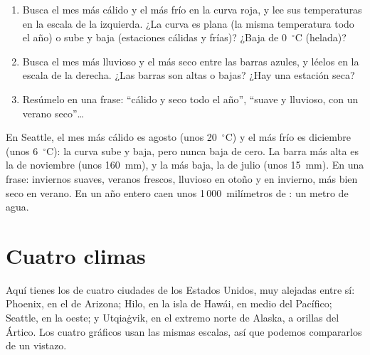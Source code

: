 \begin{method}\label{met:g5:weather-and-climate:reading}
\begin{enumerate}
  \item Busca el mes más cálido y el más frío en la curva roja, y lee sus
        temperaturas en la escala de la izquierda. ¿La curva es plana (la
        misma temperatura todo el año) o sube y baja (estaciones cálidas y
        frías)? ¿Baja de 0~$^\circ$C (helada)?
  \item Busca el mes más lluvioso y el más seco entre las barras azules, y
        léelos en la escala de la derecha. ¿Las barras son altas o bajas?
        ¿Hay una estación seca?
  \item Resúmelo en una frase: ``cálido y seco todo el año'', ``suave y
        lluvioso, con un verano seco''{\ldots}
\end{enumerate}
\end{method}

\begin{example}[Seattle]\label{ex:g5:weather-and-climate:seattle}
En Seattle, el mes más cálido es agosto (unos 20~$^\circ$C) y el más frío
es diciembre (unos 6~$^\circ$C): la curva sube y baja, pero nunca baja de
cero. La barra más alta es la de noviembre (unos 160~mm), y la más baja, la
de julio (unos 15~mm). En una frase: inviernos suaves, veranos frescos,
lluvioso en otoño y en invierno, más bien seco en verano. En un año entero
caen unos 1\,000~milímetros de : un metro de agua.
\end{example}

\section{Cuatro climas}

Aquí tienes los  de cuatro ciudades de los Estados Unidos, muy
alejadas entre sí: Phoenix, en el  de Arizona; Hilo, en la isla de
Hawái, en medio del  Pacífico; Seattle, en la  oeste; y
Utqiaġvik, en el extremo norte de Alaska, a orillas del  Ártico. Los
cuatro gráficos usan las mismas escalas, así que podemos compararlos de un
vistazo.

